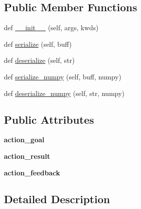 \subsection*{Public Member Functions}
\begin{DoxyCompactItemize}
\item 
def \hyperlink{classmotion__plan_1_1msg_1_1__PlanningAction_1_1PlanningAction_abd38e11621c18149d6effffbe1855ab2}{\+\_\+\+\_\+init\+\_\+\+\_\+} (self, args, kwds)
\item 
def \hyperlink{classmotion__plan_1_1msg_1_1__PlanningAction_1_1PlanningAction_a9d3850a45685dff0e6fa0bc7ee37c343}{serialize} (self, buff)
\item 
def \hyperlink{classmotion__plan_1_1msg_1_1__PlanningAction_1_1PlanningAction_aca61d36fc92b5b569aea5932fdbe8265}{deserialize} (self, str)
\item 
def \hyperlink{classmotion__plan_1_1msg_1_1__PlanningAction_1_1PlanningAction_a116c183cacd2ad74c6e9353bcb482a2c}{serialize\+\_\+numpy} (self, buff, numpy)
\item 
def \hyperlink{classmotion__plan_1_1msg_1_1__PlanningAction_1_1PlanningAction_a7f310fc818ff51a258529b523b0f7ba5}{deserialize\+\_\+numpy} (self, str, numpy)
\end{DoxyCompactItemize}
\subsection*{Public Attributes}
\begin{DoxyCompactItemize}
\item 
\mbox{\label{classmotion__plan_1_1msg_1_1__PlanningAction_1_1PlanningAction_ae5d48a93d1d7755f252ee8069020f710}} 
{\bfseries action\+\_\+goal}
\item 
\mbox{\label{classmotion__plan_1_1msg_1_1__PlanningAction_1_1PlanningAction_a7278204ec37eb09cdc8212867ef72ce2}} 
{\bfseries action\+\_\+result}
\item 
\mbox{\label{classmotion__plan_1_1msg_1_1__PlanningAction_1_1PlanningAction_a29279c694a42fb26e976edc87a065977}} 
{\bfseries action\+\_\+feedback}
\end{DoxyCompactItemize}


\subsection{Detailed Description}


